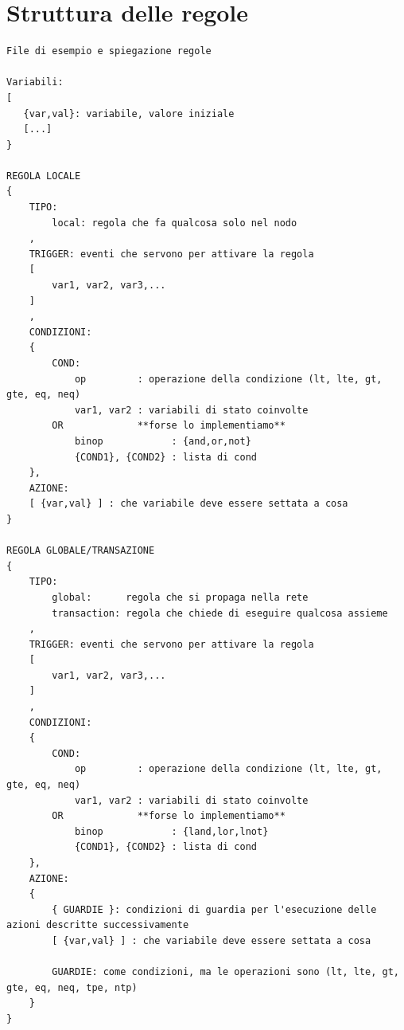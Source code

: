 \documentclass[italian]{memoir}
\begin{document}
\chapter{Struttura delle regole}\label{code:rulesstruct}
\begin{verbatim}
File di esempio e spiegazione regole

Variabili:
[
   {var,val}: variabile, valore iniziale
   [...]
}

REGOLA LOCALE
{
    TIPO:
        local: regola che fa qualcosa solo nel nodo
    ,
    TRIGGER: eventi che servono per attivare la regola
    [
        var1, var2, var3,...
    ]
    ,
    CONDIZIONI:
    {
        COND:
            op         : operazione della condizione (lt, lte, gt, gte, eq, neq)
            var1, var2 : variabili di stato coinvolte
        OR             **forse lo implementiamo**
            binop            : {and,or,not}
            {COND1}, {COND2} : lista di cond
    },
    AZIONE:
    [ {var,val} ] : che variabile deve essere settata a cosa
}

REGOLA GLOBALE/TRANSAZIONE
{
    TIPO:
        global:      regola che si propaga nella rete
        transaction: regola che chiede di eseguire qualcosa assieme
    ,
    TRIGGER: eventi che servono per attivare la regola
    [
        var1, var2, var3,...
    ]
    ,
    CONDIZIONI:
    {
        COND:
            op         : operazione della condizione (lt, lte, gt, gte, eq, neq)
            var1, var2 : variabili di stato coinvolte
        OR             **forse lo implementiamo**
            binop            : {land,lor,lnot}
            {COND1}, {COND2} : lista di cond
    },
    AZIONE:
    {
        { GUARDIE }: condizioni di guardia per l'esecuzione delle azioni descritte successivamente
        [ {var,val} ] : che variabile deve essere settata a cosa

        GUARDIE: come condizioni, ma le operazioni sono (lt, lte, gt, gte, eq, neq, tpe, ntp)
    }
}
\end{verbatim}
\end{document}
